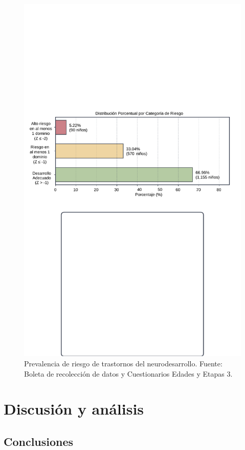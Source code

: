 \documentclass[11pt,letterpaper]{report}
\begin{document}
\begin{figure}[htbp]
    \centering
    \includegraphics[width=1\textwidth]{prevalencia_desarrollo_infantil}
	\captionsetup{font=footnotesize}
    \caption{Prevalencia de riesgo de trastornos del neurodesarrollo. Fuente:
	Boleta de recolección de datos y Cuestionarios Edades y Etapas 3.}
    \label{fig:prevalencia_desarrollo}
\end{figure}

\chapter{Discusión y análisis}
\section{Conclusiones}
\end{document}
